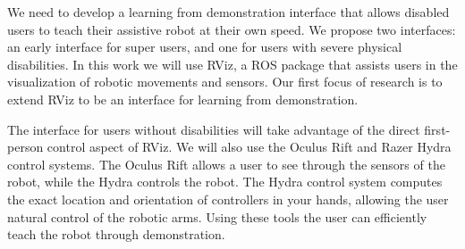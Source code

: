 \documentclass{sig-alternate-2013}
\begin{document}
We need to develop a learning from demonstration interface that allows disabled users to teach their assistive robot at their own speed. We propose two interfaces: an early interface for super users, and one for users with severe physical disabilities. In this work we will use RViz, a ROS \cite{quigley:ros} package that assists users in the visualization of robotic movements and sensors.  Our first focus of research is to extend RViz to be an interface for learning from demonstration. 

The interface for users without disabilities will take advantage of the direct first-person control aspect of RViz.  We will also use the Oculus Rift and Razer Hydra control systems. The Oculus Rift allows a user to see through the sensors of the robot, while the Hydra controls the robot. The Hydra control system computes the exact location and orientation of controllers in your hands, allowing the user natural control of the robotic arms. Using these tools the user can efficiently teach the robot through demonstration.

\end{document}
